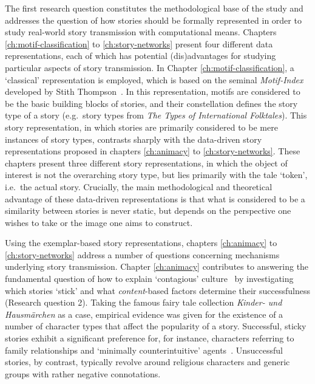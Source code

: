 The first research question constitutes the methodological base of the study and addresses the question of how stories should be formally represented in order to study real-world story transmission with computational means. Chapters \ref{ch:motif-classification} to \ref{ch:story-networks} present four different data representations, each of which has potential (dis)advantages for studying particular aspects of story transmission. In Chapter \ref{ch:motif-classification}, a `classical' representation is employed, which is based on the seminal \emph{Motif-Index} developed by Stith Thompson~\autocite{thompson:1955}. In this representation, motifs are considered to be the basic building blocks of stories, and their constellation defines the story type of a story (e.g.\ story types from \emph{The Types of International Folktales}\autocite{uther:2004}). This story representation, in which stories are primarily considered to be mere instances of story types, contrasts sharply with the data-driven story representations proposed in chapters \ref{ch:animacy} to \ref{ch:story-networks}. These chapters present three different story representations, in which the object of interest is not the overarching story type, but lies primarily with the tale `token', i.e.\ the actual story. Crucially, the main methodological and theoretical advantage of these data-driven representations is that what is considered to be a similarity between stories is never static, but depends on the perspective one wishes to take or the image one aims to construct.

Using the exemplar-based story representations, chapters \ref{ch:animacy} to \ref{ch:story-networks} address a number of questions concerning mechanisms underlying story transmission. Chapter \ref{ch:animacy} contributes to answering the fundamental question of how to explain `contagious' culture~\autocite[Cf.][]{sperber:1996} by investigating which stories `stick' and what \emph{content}-based factors determine their successfulness (Research question 2). Taking the famous fairy tale collection \emph{Kinder- und Hausmärchen} as a case, empirical evidence was given for the existence of a number of character types that affect the popularity of a story. Successful, sticky stories exhibit a significant preference for, for instance, characters referring to family relationships and `minimally counterintuitive' agents~\autocite[See e.g.][]{Barrett:2009}. Unsuccessful stories, by contrast, typically revolve around religious characters and generic groups with rather negative connotations.

